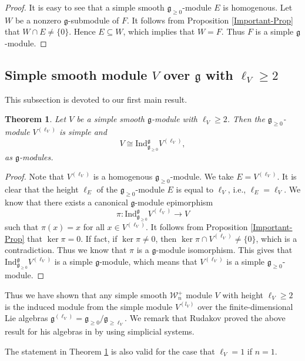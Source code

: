 \documentclass[12pt, a4paper]{amsart}
\newcommand{\fg}{\mathfrak g}
\theoremstyle{Theorem}
\theoremstyle{Theorem}
\newtheorem{thm}{Theorem}[section]
\numberwithin{equation}{section}
\begin{document}
\begin{proof}
It is easy to see that a simple smooth $\fg_{\geq0}$-module $E$ is homogenous.
Let $W$ be a nonzero $\fg$-submodule of $F$. It follows from Proposition \ref{Important-Prop} that $W\cap E\neq\{0\}$.
Hence $E\subseteq W$, which implies that $W=F$. Thus $F$ is a simple $\fg$-module.
\end{proof}

\subsection{Simple smooth module $V$ over $\fg$ with $\ell_{V}\ge2$}

This subsection is devoted to our first main result.

\begin{thm}\label{main-result}
Let $V$ be a simple smooth $\mathfrak{g}$-module with $\ell_V\ge2$.
Then the $\mathfrak{g}_{\geq0}$-module $V^{(\ell_V)}$ is simple and
\[V\cong\mathrm{Ind}_{\mathfrak{g}_{\geq0}}^{\mathfrak{g}}V^{(\ell_V)},\]
as $\mathfrak{g}$-modules.
\end{thm}
\begin{proof}
Note that $V^{(\ell_{V})}$ is a homogenous $\fg_{\geq0}$-module.
We take $E=V^{(\ell_{V})}$. It is clear that the height $\ell_{E}$ of the $\fg_{\geq0}$-module
$E$ is equal to $\ell_{V}$, i.e., $\ell_{E}=\ell_{V}$. We know that 
there exists a canonical $\fg$-module epimorphism
\[\pi:\text{Ind}_{\mathfrak{g}_{\geq0}}^{\mathfrak{g}}V^{(\ell_V)}\rightarrow V\]
such that $\pi(x)=x$ for all $x\in V^{(\ell_V)}$. It follows from Proposition \ref{Important-Prop}
that $\ker \pi=0$. If fact, if $\ker \pi\neq0$, then $\ker \pi\cap V^{(\ell_V)}\neq\{0\}$, which is a contradiction.
Thus we know that $\pi$ is a $\fg$-module isomorphism.
This gives that $\mathrm{Ind}_{\mathfrak{g}_{\geq0}}^{\mathfrak{g}}V^{(\ell_V)}$ is a simple $\fg$-module, which means that
$V^{(\ell_V)}$ is a simple $\mathfrak{g}_{\geq0}$-module.
\end{proof}
Thus we have shown that any simple smooth $\mathcal{W}_{n}^{+}$
module $V$ with   height $\ell_V \geq 2$ is the induced module from the simple module $V^{(l_V)}$ over the finite-dimensional  Lie algebras $\mathfrak{g}^{(\ell_V)}=\mathfrak{g}_{\geq0} / \mathfrak{g}_{\geq \ell_V}$. 
We remark that Rudakov    proved the above result   for his algebras in \cite{R} by using simplicial systems. 

The statement in Theorem \ref{main-result} is also valid for the case that $\ell_{V}=1$ if $n=1$.
\end{document}

